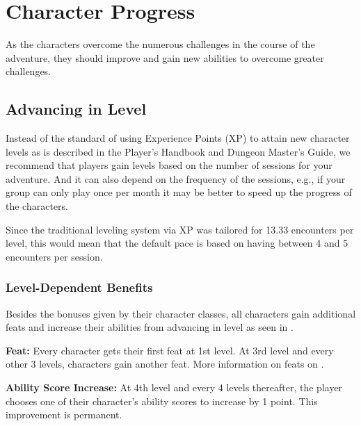 \section{Character Progress}
As the characters overcome the numerous challenges in the course of the adventure, they should improve and gain new abilities to overcome greater challenges.

\subsection{Advancing in Level}
Instead of the standard of using Experience Points (XP) to attain new character levels as is described in the Player's Handbook and Dungeon Master's Guide, we recommend that players gain levels based on the number of sessions for your adventure. And it can also depend on the frequency of the sessions, e.g., if your group can only play once per month it may be better to speed up the progress of the characters.


Since the traditional leveling system via XP was tailored for 13.33 encounters per level, this would mean that the default pace is based on having between 4 and 5 encounters per session.

\subsubsection{Level-Dependent Benefits}
Besides the bonuses given by their character classes, all characters gain additional feats and increase their abilities from advancing in level as seen in .

\textbf{Feat:} Every character gets their first feat at 1st level. At 3rd level and every other 3 levels, characters gain another feat. More information on feats on .

\textbf{Ability Score Increase:} At 4th level and every 4 levels thereafter, the player chooses one of their character's ability scores to increase by 1 point. This improvement is permanent.

